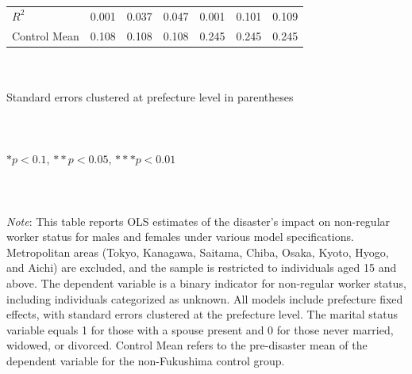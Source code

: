 \documentclass[serif, aspectratio=169]{beamer}
\newcommand{\nonregularlinks}{%
    \vfill %
    \hfill %
    {\small %
        \hyperlink{nonregular_placebo}{\beamerbutton{Placebo test}} \,
    }
}
\begin{document}
\begin{frame}[label=nonregular_status]
\begin{table}[htbp]
\begin{tabular}{@{}l*{6}{c}@{}}
$\textit{R}^2$&    0.001         &    0.037         &    0.047         &    0.001         &    0.101         &    0.109         \\
Control Mean&    0.108         &    0.108         &    0.108         &    0.245         &    0.245         &    0.245         \\
\bottomrule
\end{tabular}
\\\\{\linewidth}{\tiny Standard errors clustered at prefecture level in parentheses}\\\\
\\\\{\linewidth}{\tiny $*p<0.1$, $**p<0.05$, $***p<0.01$}\\\\
\\\\{\linewidth}{\tiny \textit{Note}: This table reports OLS estimates of the disaster's impact on non-regular worker status for males and females under various model specifications. Metropolitan areas (Tokyo, Kanagawa, Saitama, Chiba, Osaka, Kyoto, Hyogo, and Aichi) are excluded, and the sample is restricted to individuals aged 15 and above. The dependent variable is a binary indicator for non-regular worker status, including individuals categorized as unknown. All models include prefecture fixed effects, with standard errors clustered at the prefecture level. The marital status variable equals 1 for those with a spouse present and 0 for those never married, widowed, or divorced. Control Mean refers to the pre-disaster mean of the dependent variable for the non-Fukushima control group.}
\end{table}

\vspace{-2.2cm}
\nonregularlinks


\end{frame}







\end{document}
